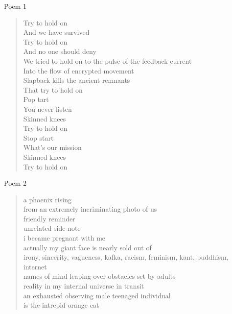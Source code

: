 \documentclass[xcolor={usenames,svgnames,x11names,dvipsnames,table}]{beamer}
\begin{document}
\begin{frame}{Poem 1}
    \small
    \begin{quote}
        Try to hold on\\
        And we have survived\\
        Try to hold on\\
        And no one should deny\\
        We tried to hold on to the pulse of the feedback current\\
        Into the flow of encrypted movement\\
        Slapback kills the ancient remnants\\
        That try to hold on \\
        Pop tart\\
        You never listen\\
        Skinned knees\\
        Try to hold on\\
        Stop start\\
        What's our mission\\
        Skinned knees\\
        Try to hold on\\
    \end{quote}
\end{frame}

\begin{frame}{Poem 2}
    \small
    \begin{quote}
        a phoenix rising \\
        from an extremely incriminating photo of us \\
        friendly reminder\\
        unrelated side note \\
        i became pregnant with me\\
        actually my giant face is nearly sold out of\\
        irony, sincerity, vagueness, kafka, racism, feminism, kant, buddhism, internet\\
        names of mind leaping over obstacles set by adults\\
        reality in my internal universe in transit\\
        an exhausted observing male teenaged individual \\
        is the intrepid orange cat\\
    \end{quote}
\end{frame}
\end{document}
